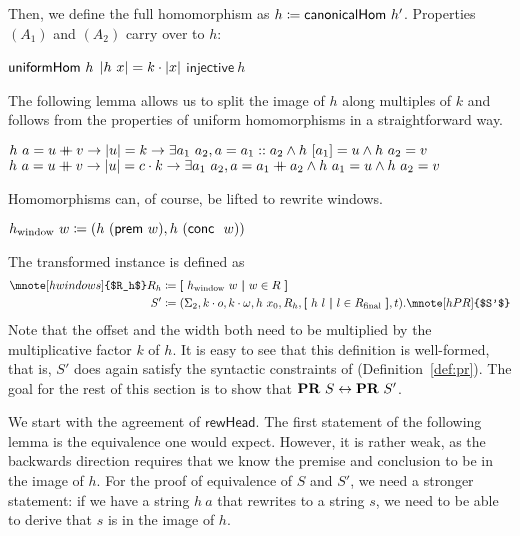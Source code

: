 Then, we define the full homomorphism as $h \coloneqq \textsf{canonicalHom}~h'$. 
Properties $(A_1)$ and $(A_2)$ carry over to $h$:
\begin{proposition}\label{prop:h_properties}\leavevmode
  \begin{enumerate}
    \coqitem[h_unifHom] $\textsf{uniformHom}~h$
    \coqitem[h_multiplier] $|h~x| = k \cdot |x|$
    \coqitem[h_injective] $\textsf{injective}~h$
  \end{enumerate}
\end{proposition}

The following lemma allows us to split the image of $h$ along multiples of $k$ and follows from the properties of uniform homomorphisms in a straightforward way.
\begin{lemma}[Inversion of $h$]\label{lem:h_inv}\leavevmode
  \begin{enumerate}
     $h~a = u \mathbin{+\mkern-10mu+} v \rightarrow |u| = k \rightarrow \exists a_1~a_2, a = a_1 :: a_2 \land h~[a_1] = u \land h~a_2 = v$
     $h~a = u \mathbin{+\mkern-10mu+} v \rightarrow |u| = c \cdot k \rightarrow \exists a_1~a_2, a = a_1 \mathbin{+\mkern-10mu+} a_2 \land h~a_1 = u \land h~a_2 = v$ 
  \end{enumerate}
\end{lemma}

Homomorphisms can, of course, be lifted to rewrite windows. 
\begin{definition}
  $h_\text{window}~w\coloneqq (h~(\textsf{prem}~w), h~(\textsf{conc}~~w)) $
\end{definition}
The transformed \PR{} instance is defined as
\begin{align*}
  \mnote[hwindows]{$R_h$}
  R_h &\defeq \withl h_\text{window}~w \withm w \in R \withr \\
  S' &\defeq (\Sigma_2, k \cdot o, k \cdot \omega, h~x_0, R_h, \withl h~l \withm l \in \Rfinal \withr, t).
  \mnote[hPR]{$S'$}
\end{align*}
Note that the offset and the width both need to be multiplied by the multiplicative factor $k$ of $h$.
It is easy to see that this definition is well-formed, that is, $S'$ does again satisfy the syntactic constraints of \PR{} (Definition~\ref{def:pr}).
The goal for the rest of this section is to show that $\textbf{PR}{}~S \leftrightarrow \textbf{PR}{}~S'$. 

We start with the agreement of $\textsf{rewHead}$.
The first statement of the following lemma is the equivalence one would expect. However, it is rather weak, as the backwards direction requires that we know the premise and conclusion to be in the image of $h$.
For the proof of equivalence of $S$ and $S'$, we need a stronger statement: if we have a string $h~a$ that rewrites to a string $s$, we need to be able to derive that $s$ is in the image of $h$.

